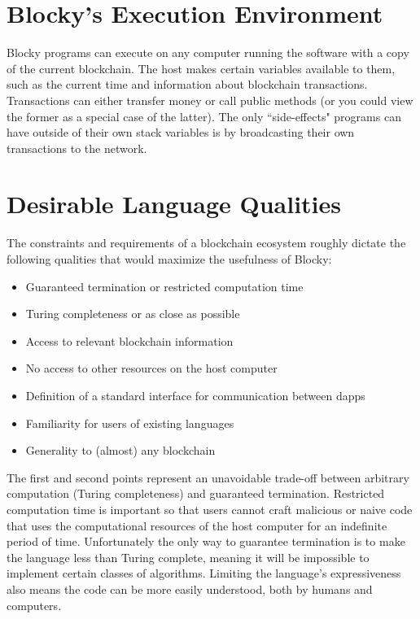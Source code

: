 \documentclass[letterpaper]{article}
\begin{document}
\section{Blocky's Execution Environment}

Blocky programs can execute on any computer running the software with a copy of the current blockchain. The host makes certain variables available to them, such as the current time and information about blockchain transactions. Transactions can either transfer money or call public methods (or you could view the former as a special case of the latter). The only ``side-effects" programs can have outside of their own stack variables is by broadcasting their own transactions to the network.

\section{Desirable Language Qualities}

The constraints and requirements of a blockchain ecosystem roughly dictate the following qualities that would maximize the usefulness of Blocky:
\begin{itemize}
  \item{Guaranteed termination or restricted computation time}
  \item{Turing completeness or as close as possible}
  \item{Access to relevant blockchain information}
  \item{No access to other resources on the host computer}
  \item{Definition of a standard interface for communication between dapps}
  \item{Familiarity for users of existing languages}
  \item{Generality to (almost) any blockchain}
\end{itemize}

The first and second points represent an unavoidable trade-off between arbitrary computation (Turing completeness) and guaranteed termination. Restricted computation time is important so that users cannot craft malicious or naive code that uses the computational resources of the host computer for an indefinite period of time. Unfortunately the only way to guarantee termination is to make the language less than Turing complete, meaning it will be impossible to implement certain classes of algorithms\cite{turing37}. Limiting the language's expressiveness also means the code can be more easily understood, both by humans and computers\cite{plant15}.
\end{document}
